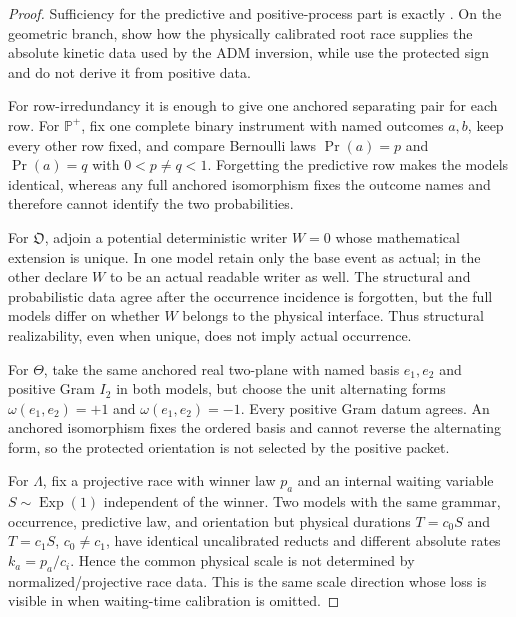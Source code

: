 \documentclass[11pt]{article}
\theoremstyle{definition}
\theoremstyle{remark}
\begin{document}
\begin{proof}
Sufficiency for the predictive and positive-process part is exactly
.  On the geometric branch,
 show how the
physically calibrated root race supplies the absolute kinetic data used by the
ADM inversion, while
 use the protected sign and do not derive it from
positive data.

For row-irredundancy it is enough to give one anchored separating pair for each
row.  For $\mathbb P^+$, fix one complete binary instrument with named outcomes
$a,b$, keep every other row fixed, and compare Bernoulli laws
$\Pr(a)=p$ and $\Pr(a)=q$ with $0<p\ne q<1$.  Forgetting the predictive row
makes the models identical, whereas any full anchored isomorphism fixes the
outcome names and therefore cannot identify the two probabilities.

For $\mathfrak O$, adjoin a potential deterministic writer $W=0$ whose
mathematical extension is unique.  In one model retain only the base event as
actual; in the other declare $W$ to be an actual readable writer as well.  The
structural and probabilistic data agree after the occurrence incidence is
forgotten, but the full models differ on whether $W$ belongs to the physical
interface.  Thus structural realizability, even when unique, does not imply
actual occurrence.

For $\Theta$, take the same anchored real two-plane with named basis
$e_1,e_2$ and positive Gram $I_2$ in both models, but choose the unit
alternating forms $\omega(e_1,e_2)=+1$ and
$\omega(e_1,e_2)=-1$.  Every positive Gram datum agrees.  An anchored
isomorphism fixes the ordered basis and cannot reverse the alternating form,
so the protected orientation is not selected by the positive packet.

For $\Lambda$, fix a projective race with winner law $p_a$ and an internal
waiting variable $S\sim\operatorname{Exp}(1)$ independent of the winner.  Two
models with the same grammar, occurrence, predictive law, and orientation but
physical durations $T=c_0S$ and $T=c_1S$, $c_0\ne c_1$, have identical
uncalibrated reducts and different absolute rates $k_a=p_a/c_i$.  Hence the
common physical scale is not determined by normalized/projective race data.
This is the same scale direction whose loss is visible in
 when waiting-time calibration is omitted.


\end{proof}
\end{document}
